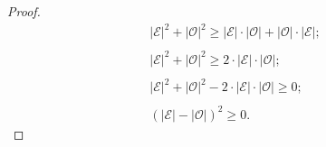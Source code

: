 \begin{lemma}
\begin{proof}
\begin{equation*}
            \begin{array}{l}
                |\mathcal{E}|^2+|\mathcal{O}|^2\geq |\mathcal{E}|\cdot|\mathcal{O}| + |\mathcal{O}|\cdot|\mathcal{E}|;\\\\
                |\mathcal{E}|^2+|\mathcal{O}|^2\geq 2\cdot|\mathcal{E}|\cdot|\mathcal{O}|;\\\\
                |\mathcal{E}|^2+|\mathcal{O}|^2 - 2\cdot|\mathcal{E}|\cdot|\mathcal{O}|\geq 0; \\\\
                (|\mathcal{E}| - |\mathcal{O}|)^2 \geq 0.
            \end{array}
        \end{equation*}
    \end{proof}
\end{lemma}
